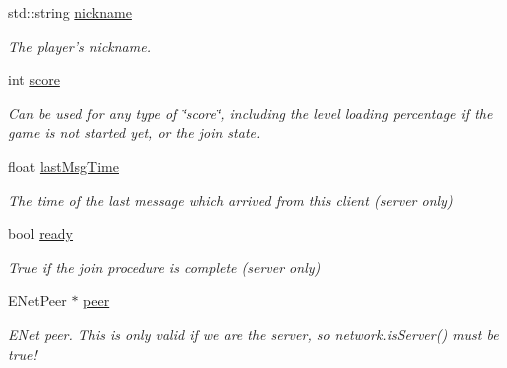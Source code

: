 \begin{DoxyCompactItemize}
\item 
\hypertarget{structNetworkPlayer_a2c54b8d9930a110b11efc540c27a527d}{
std\-::string \hyperlink{structNetworkPlayer_a2c54b8d9930a110b11efc540c27a527d}{nickname}}
\label{d4/dd8/structNetworkPlayer_a2c54b8d9930a110b11efc540c27a527d}

\begin{DoxyCompactList}\small\item\em \-The player's nickname. \end{DoxyCompactList}\item 
int \hyperlink{structNetworkPlayer_af452133f33571ac0d7904a1bf392fc29}{score}
\begin{DoxyCompactList}\small\item\em \-Can be used for any type of \char`\"{}score\char`\"{}, including the level loading percentage if the game is not started yet, or the join state. \end{DoxyCompactList}\item 
\hypertarget{structNetworkPlayer_ac859ca1c59034c820a3e8e706de2eac1}{
float \hyperlink{structNetworkPlayer_ac859ca1c59034c820a3e8e706de2eac1}{last\-Msg\-Time}}
\label{d4/dd8/structNetworkPlayer_ac859ca1c59034c820a3e8e706de2eac1}

\begin{DoxyCompactList}\small\item\em \-The time of the last message which arrived from this client (server only) \end{DoxyCompactList}\item 
\hypertarget{structNetworkPlayer_a32e0a5d27526c9e04240a439b3a8c5f9}{
bool \hyperlink{structNetworkPlayer_a32e0a5d27526c9e04240a439b3a8c5f9}{ready}}
\label{d4/dd8/structNetworkPlayer_a32e0a5d27526c9e04240a439b3a8c5f9}

\begin{DoxyCompactList}\small\item\em \-True if the join procedure is complete (server only) \end{DoxyCompactList}\item 
\hypertarget{structNetworkPlayer_a02f87bdf50987491a178450e5130950b}{
\-E\-Net\-Peer $\ast$ \hyperlink{structNetworkPlayer_a02f87bdf50987491a178450e5130950b}{peer}}
\label{d4/dd8/structNetworkPlayer_a02f87bdf50987491a178450e5130950b}

\begin{DoxyCompactList}\small\item\em \-E\-Net peer. \-This is only valid if we are the server, so network.\-is\-Server() must be true! \end{DoxyCompactList}\end{DoxyCompactItemize}


